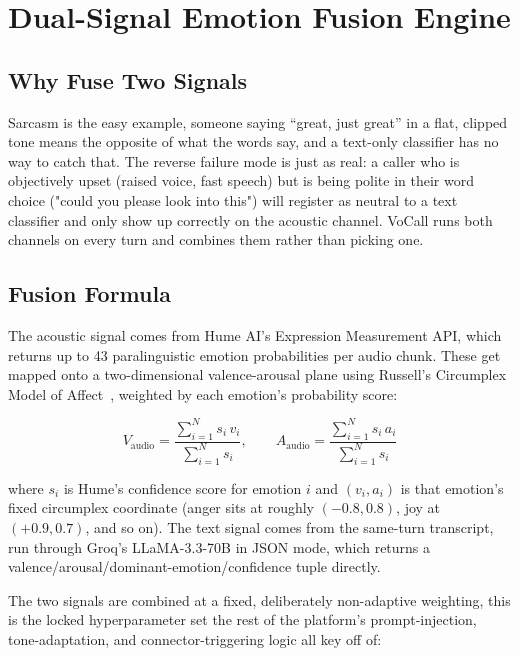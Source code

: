 \documentclass[conference]{IEEEtran}
\begin{document}
\section{Dual-Signal Emotion Fusion Engine}
\label{sec:emotion}

\subsection{Why Fuse Two Signals}

Sarcasm is the easy example, someone saying ``great, just great'' in a flat, clipped tone means the opposite of what the words say, and a text-only classifier has no way to catch that. The reverse failure mode is just as real: a caller who is objectively upset (raised voice, fast speech) but is being polite in their word choice ("could you please look into this") will register as neutral to a text classifier and only show up correctly on the acoustic channel. VoCall runs both channels on every turn and combines them rather than picking one.

\subsection{Fusion Formula}

The acoustic signal comes from Hume AI's Expression Measurement API, which returns up to 43 paralinguistic emotion probabilities per audio chunk. These get mapped onto a two-dimensional valence-arousal plane using Russell's Circumplex Model of Affect~\cite{russell1980circumplex}, weighted by each emotion's probability score:

\begin{equation}
V_{\text{audio}} = \frac{\sum_{i=1}^{N} s_i \, v_i}{\sum_{i=1}^{N} s_i}, \qquad
A_{\text{audio}} = \frac{\sum_{i=1}^{N} s_i \, a_i}{\sum_{i=1}^{N} s_i}
\label{eq:circumplex}
\end{equation}

where $s_i$ is Hume's confidence score for emotion $i$ and $(v_i, a_i)$ is that emotion's fixed circumplex coordinate (anger sits at roughly $(-0.8, 0.8)$, joy at $(+0.9, 0.7)$, and so on). The text signal comes from the same-turn transcript, run through Groq's LLaMA-3.3-70B in JSON mode, which returns a valence/arousal/dominant-emotion/confidence tuple directly.

The two signals are combined at a fixed, deliberately non-adaptive weighting, this is the locked hyperparameter set the rest of the platform's prompt-injection, tone-adaptation, and connector-triggering logic all key off of:
\end{document}
